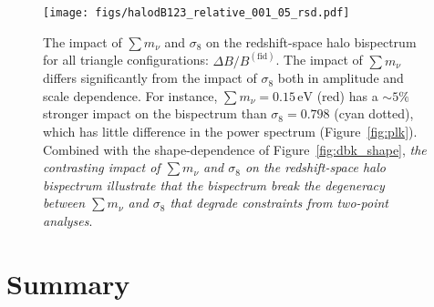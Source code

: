 \documentclass[12pt, letterpaper, preprint]{aastex62}
\newcommand{\smnu}{\sum m_\nu}
\newcommand{\sig}{\sigma_8}
\begin{document}
\begin{figure}
\begin{center}
\texttt{[image: figs/halodB123\_relative\_001\_05\_rsd.pdf]}
    \caption{The impact of $\smnu$ and $\sig$ on the redshift-space 
    halo bispectrum for all triangle configurations: $\Delta B/B^\mathrm{(fid)}$. 
    The impact of $\smnu$ differs significantly from the impact of $\sig$ 
    both in amplitude and scale dependence. For instance, $\smnu = 0.15\,\mathrm{eV}$ 
    (red) has a $\sim 5\%$ stronger impact on the bispectrum than $\sig = 0.798$ 
    (cyan dotted), which has little difference in the power spectrum (Figure~\ref{fig:plk}). 
    Combined with the shape-dependence of Figure~\ref{fig:dbk_shape}, {\em the 
    contrasting impact of $\smnu$ and $\sig$ on the redshift-space halo bispectrum 
    illustrate that the bispectrum break the degeneracy between $\smnu$
    and $\sig$ that degrade constraints from two-point analyses}. 
    }
\label{fig:dbk_amp}
\end{center}
\end{figure}



\section{Summary} 

%
\end{document}
